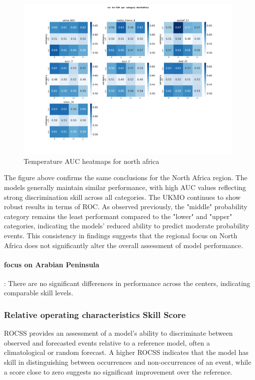 \begin{figure}[H]
\includegraphics[scale=0.3]{plots/prob/roc/roc_T2M_category_NorthAfrica.png}
\caption{Temperature AUC  heatmaps for north africa }
\end{figure}

The figure above confirms the same conclusions for the North Africa region. The models generally maintain similar performance, with high AUC values reflecting strong discrimination skill across all categories. The UKMO continues to show robust results in terms of ROC. As observed previously, the "middle" probability category remains the least performant compared to the "lower" and "upper" categories, indicating the models' reduced ability to predict moderate probability events. This consistency in findings suggests that the regional focus on North Africa does not significantly alter the overall assessment of model performance.
\paragraph{focus on Arabian Peninsula}:
There are no significant differences in performance across the centers, indicating comparable skill levels.

\subsubsection{Relative operating characteristics Skill Score}
ROCSS provides an assessment of a model's ability to discriminate between observed and forecasted events relative to a reference model, often a climatological or random forecast. A higher ROCSS indicates that the model has skill in distinguishing between occurrences and non-occurrences of an event, while a score close to zero suggests no significant improvement over the reference.

